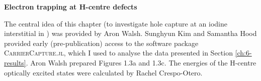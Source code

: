 \vspace{\frontmatterbaselineskip}

\textbf{Electron trapping at H-centre defects}

The central idea of this chapter (to investigate hole capture at an iodine interstitial in ) was provided by Aron Walsh. Sunghyun Kim and Samantha Hood provided early (pre-publication) access to the software package \textsc{CarrierCapture.jl}, which I used to analyse the data presented in Section \ref{ch:6-results}. Aron Walsh prepared Figures 1.3a and 1.3c. The energies of the H-centre optically excited states were calculated by Rachel Crespo-Otero.